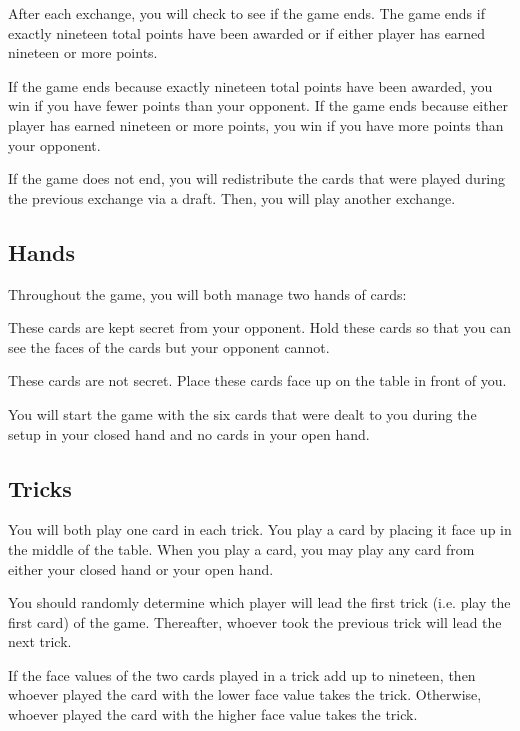 \documentclass[a6paper, parskip=half, DIV=14, 10pt]{scrartcl}
\begin{document}
After each exchange, you will check to see if the game ends. The game ends if exactly nineteen total points have been awarded or if either player has earned nineteen or more points.

If the game ends because exactly nineteen total points have been awarded, you win if you have fewer points than your opponent. If the game ends because either player has earned nineteen or more points, you win if you have more points than your opponent.

If the game does not end, you will redistribute the cards that were played during the previous exchange via a draft. Then, you will play another exchange.

\newpage

\subsection*{Hands}
Throughout the game, you will both manage two hands of cards:
\begin{description}[leftmargin=0pt, labelsep=\widthof{\ }]
	\item[Closed Hand \textendash] These cards are kept secret from your opponent. Hold these cards so that you can see the faces of the cards but your opponent cannot.
	\item[Open Hand \textendash] These cards are not secret. Place these cards face up on the table in front of you.
\end{description}
You will start the game with the six cards that were dealt to you during the setup in your closed hand and no cards in your open hand.

\newpage

\subsection*{Tricks}
You will both play one card in each trick. You play a card by placing it face up in the middle of the table. When you play a card, you may play any card from either your closed hand or your open hand.

You should randomly determine which player will lead the first trick (i.e. play the first card) of the game. Thereafter, whoever took the previous trick will lead the next trick.

If the face values of the two cards played in a trick add up to nineteen, then whoever played the card with the lower face value takes the trick. Otherwise, whoever played the card with the higher face value takes the trick.
\end{document}
